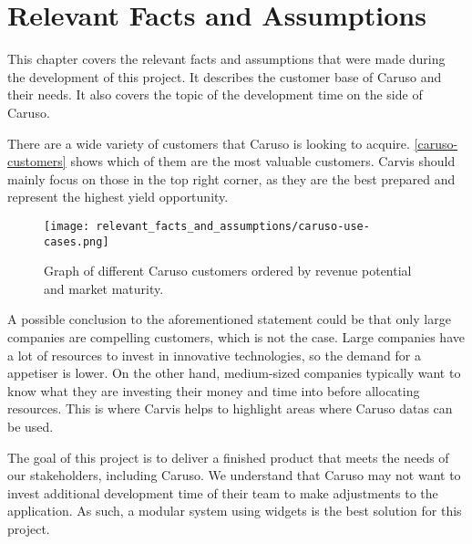 \chapter{Relevant Facts and Assumptions}

This chapter covers the relevant facts and assumptions that were made during the development of this project. It describes the customer base of Caruso and their needs. It also covers the topic of the development time on the side of Caruso.

There are a wide variety of customers that Caruso is looking to acquire. \autoref{caruso-customers} shows which of them are the most valuable customers. Carvis should mainly focus on those in the top right corner, as they are the best prepared and represent the highest yield opportunity.

\begin{figure}[ht]
  \centering
  \texttt{[image: relevant\_facts\_and\_assumptions/caruso-use-cases.png]}
  \caption{Graph of different Caruso customers ordered by revenue potential and market maturity.}
  \label{caruso-customers}
\end{figure}

A possible conclusion to the aforementioned statement could be that only large companies are compelling customers, which is not the case. Large companies have a lot of resources to invest in innovative technologies, so the demand for a \gls{appetiser} is lower. On the other hand, medium-sized companies typically want to know what they are investing their money and time into before allocating resources. This is where Carvis helps to highlight areas where Caruso \glspl{data} can be used.

The goal of this project is to deliver a finished product that meets the needs of our \glspl{stakeholder}, including Caruso. We understand that Caruso may not want to invest additional development time of their team to make adjustments to the application. As such, a modular system using \glspl{widget} is the best solution for this project.